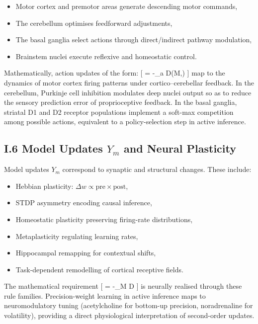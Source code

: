 \documentclass[11pt,a4paper,twoside]{article}
\begin{document}
\begin{itemize}
\item Motor cortex and premotor areas generate descending motor commands,
\item The cerebellum optimises feedforward adjustments,
\item The basal ganglia select actions through direct/indirect pathway modulation,
\item Brainstem nuclei execute reflexive and homeostatic control.
\end{itemize}

Mathematically, action updates of the form:
[
 = -\nabla_a D(M,)
]
map to the dynamics of motor cortex firing patterns under cortico--cerebellar feedback. In the cerebellum, Purkinje cell inhibition modulates deep nuclei output so as to reduce the sensory prediction error of proprioceptive feedback. In the basal ganglia, striatal D1 and D2 receptor populations implement a soft-max competition among possible actions, equivalent to a policy-selection step in active inference.

\subsection*{I.6 Model Updates $Y_m$ and Neural Plasticity}

Model updates $Y_m$ correspond to synaptic and structural changes. These include:

\begin{itemize}
\item Hebbian plasticity: $\Delta w \propto \mathrm{pre} \times \mathrm{post}$,
\item STDP asymmetry encoding causal inference,
\item Homeostatic plasticity preserving firing-rate distributions,
\item Metaplasticity regulating learning rates,
\item Hippocampal remapping for contextual shifts,
\item Task-dependent remodelling of cortical receptive fields.
\end{itemize}

The mathematical requirement
[
 = -\nabla_M D
]
is neurally realised through these rule families. Precision-weight learning in active inference maps to neuromodulatory tuning (acetylcholine for bottom-up precision, noradrenaline for volatility), providing a direct physiological interpretation of second-order updates.
\end{document}
